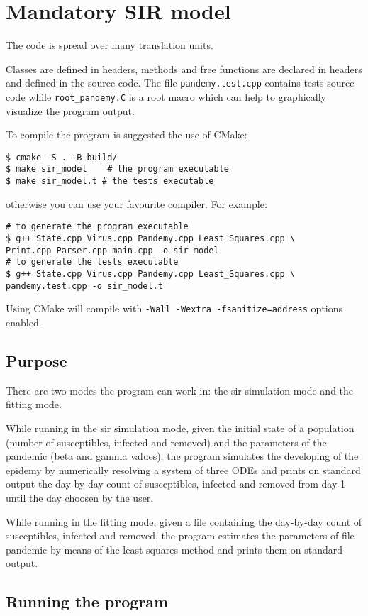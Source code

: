 \section{Mandatory SIR model}

The code is spread over many translation units.

Classes are defined in headers, methods and free functions are declared in headers and defined in the source 
code. The file \verb!pandemy.test.cpp! contains tests source code while \verb!root_pandemy.C! is a root macro 
which can help to graphically visualize the program output.

To compile the program is suggested the use of CMake:
\begin{verbatim}
$ cmake -S . -B build/
$ make sir_model    # the program executable
$ make sir_model.t # the tests executable
\end{verbatim}
otherwise you can use your favourite compiler. For example:
\begin{verbatim}
# to generate the program executable
$ g++ State.cpp Virus.cpp Pandemy.cpp Least_Squares.cpp \
Print.cpp Parser.cpp main.cpp -o sir_model
# to generate the tests executable
$ g++ State.cpp Virus.cpp Pandemy.cpp Least_Squares.cpp \
pandemy.test.cpp -o sir_model.t
\end{verbatim}
Using CMake will compile with \verb!-Wall -Wextra -fsanitize=address! options enabled.

\subsection{Purpose}

There are two modes the program can work in: the sir simulation mode and the fitting mode.

While running in the sir simulation mode, given the initial state of a population (number of susceptibles, 
infected and removed) and the parameters of the pandemic (beta and gamma values), the program simulates the 
developing of the epidemy by numerically resolving a system of three ODEs and prints on standard output the 
day-by-day count of susceptibles, infected and removed from day 1 until the day choosen by the user.

While running in the fitting mode, given a file containing the day-by-day count of susceptibles, infected and 
removed, the program estimates the parameters of file pandemic by means of the least squares method and prints 
them on standard output.

\subsection{Running the program}

